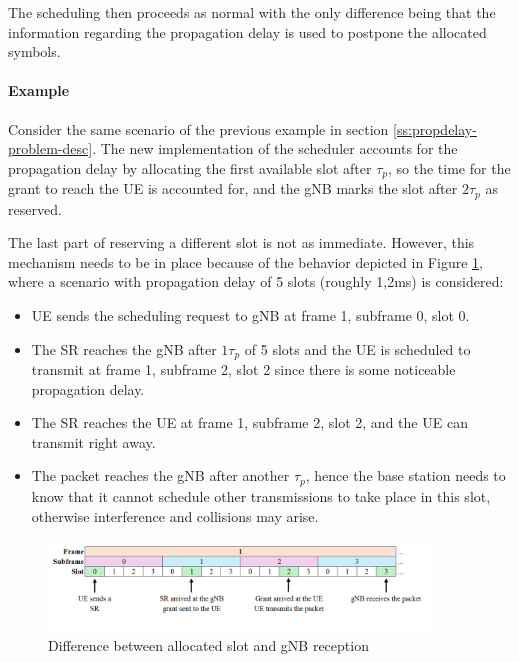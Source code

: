 The scheduling then proceeds as normal with the only difference being that the information regarding the propagation delay is used to postpone the allocated symbols. 

\paragraph{Example} Consider the same scenario of the previous example in section \ref{ss:propdelay-problem-desc}. The new implementation of the scheduler accounts for the propagation delay by allocating the first available slot after $\tau_p$, so the time for the grant to reach the \ac{UE} is accounted for, and the \ac{gNB} marks the slot after $2\tau_p$ as reserved.

The last part of reserving a different slot is not as immediate. However, this mechanism needs to be in place because of the behavior depicted in Figure \ref{fig:scheduler-allocations-pd}, where a scenario with propagation delay of 5 slots (roughly 1,2ms) is considered:


\begin{itemize}
    \item \ac{UE} sends the scheduling request to \ac{gNB} at frame 1, subframe 0, slot 0.
    \item The \ac{SR} reaches the \ac{gNB} after $1\tau_p$ of 5 slots and the \ac{UE} is scheduled to transmit at frame 1, subframe 2, slot 2 since there is some noticeable propagation delay.
    \item The \ac{SR} reaches the \ac{UE} at frame 1, subframe 2, slot 2, and the \ac{UE} can transmit right away.
    \item The packet reaches the \ac{gNB} after another $\tau_p$, hence the base station needs to know that it cannot schedule other transmissions to take place in this slot, otherwise interference and collisions may arise.
\end{itemize}

\begin{figure}[ht]
    \centering
    \includegraphics[width=0.9\textwidth]{res/scheduler-allocation-pd.png}
    \caption{Difference between allocated slot and gNB reception}
    \label{fig:scheduler-allocations-pd}
\end{figure}

